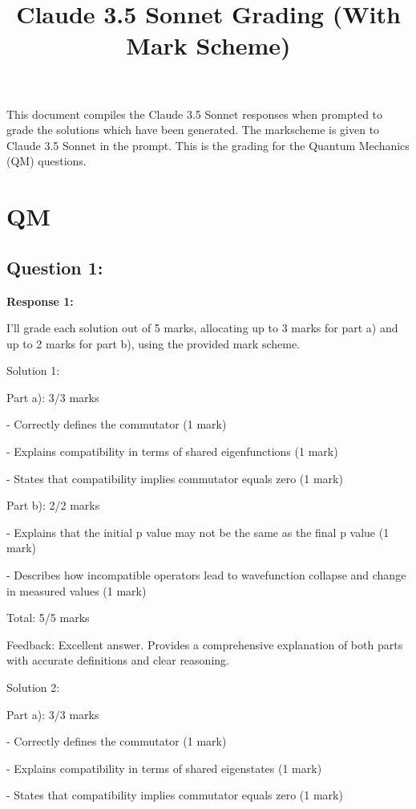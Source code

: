 \documentclass[a4paper,11pt]{article}
\begin{document}
\title{Claude 3.5 Sonnet Grading (With Mark Scheme)}
\maketitle

This document compiles the Claude 3.5 Sonnet responses when prompted to grade the solutions which have been generated. The markscheme is given to Claude 3.5 Sonnet in the prompt. This is the grading for the Quantum Mechanics (QM) questions. 

\section{QM}

\subsection*{Question 1:}

\textbf{Response 1:}

I'll grade each solution out of 5 marks, allocating up to 3 marks for part a) and up to 2 marks for part b), using the provided mark scheme.

Solution 1:

Part a): 3/3 marks

- Correctly defines the commutator (1 mark)

- Explains compatibility in terms of shared eigenfunctions (1 mark)

- States that compatibility implies commutator equals zero (1 mark)

Part b): 2/2 marks

- Explains that the initial p value may not be the same as the final p value (1 mark)

- Describes how incompatible operators lead to wavefunction collapse and change in measured values (1 mark)

Total: 5/5 marks

Feedback: Excellent answer. Provides a comprehensive explanation of both parts with accurate definitions and clear reasoning.

Solution 2:

Part a): 3/3 marks

- Correctly defines the commutator (1 mark)

- Explains compatibility in terms of shared eigenstates (1 mark)

- States that compatibility implies commutator equals zero (1 mark)
\end{document}
